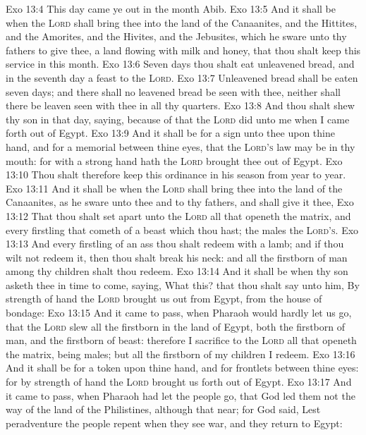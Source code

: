 \vs Exo 13:4 This day came ye out in the month Abib.
\vs Exo 13:5 And it shall be when the \textsc{Lord} shall bring thee into the land of the Canaanites, and the Hittites, and the Amorites, and the Hivites, and the Jebusites, which he sware unto thy fathers to give thee, a land flowing with milk and honey, that thou shalt keep this service in this month.
\vs Exo 13:6 Seven days thou shalt eat unleavened bread, and in the seventh day  a feast to the \textsc{Lord}.
\vs Exo 13:7 Unleavened bread shall be eaten seven days; and there shall no leavened bread be seen with thee, neither shall there be leaven seen with thee in all thy quarters.
\vs Exo 13:8 And thou shalt shew thy son in that day, saying,  because of that  the \textsc{Lord} did unto me when I came forth out of Egypt.
\vs Exo 13:9 And it shall be for a sign unto thee upon thine hand, and for a memorial between thine eyes, that the \textsc{Lord's} law may be in thy mouth: for with a strong hand hath the \textsc{Lord} brought thee out of Egypt.
\vs Exo 13:10 Thou shalt therefore keep this ordinance in his season from year to year.
\vs Exo 13:11 And it shall be when the \textsc{Lord} shall bring thee into the land of the Canaanites, as he sware unto thee and to thy fathers, and shall give it thee,
\vs Exo 13:12 That thou shalt set apart unto the \textsc{Lord} all that openeth the matrix, and every firstling that cometh of a beast which thou hast; the males  the \textsc{Lord's}.
\vs Exo 13:13 And every firstling of an ass thou shalt redeem with a lamb; and if thou wilt not redeem it, then thou shalt break his neck: and all the firstborn of man among thy children shalt thou redeem.
\vs Exo 13:14 And it shall be when thy son asketh thee in time to come, saying, What  this? that thou shalt say unto him, By strength of hand the \textsc{Lord} brought us out from Egypt, from the house of bondage:
\vs Exo 13:15 And it came to pass, when Pharaoh would hardly let us go, that the \textsc{Lord} slew all the firstborn in the land of Egypt, both the firstborn of man, and the firstborn of beast: therefore I sacrifice to the \textsc{Lord} all that openeth the matrix, being males; but all the firstborn of my children I redeem.
\vs Exo 13:16 And it shall be for a token upon thine hand, and for frontlets between thine eyes: for by strength of hand the \textsc{Lord} brought us forth out of Egypt.
\vs Exo 13:17 And it came to pass, when Pharaoh had let the people go, that God led them not  the way of the land of the Philistines, although that  near; for God said, Lest peradventure the people repent when they see war, and they return to Egypt:
